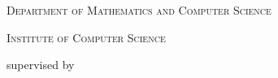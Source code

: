 \begin{titlepage}
	{\scshape\large Department of Mathematics and Computer Science}
    
	\vspace{-0.4cm}
	{\scshape\large Institute of Computer Science}
	\vspace{0.5cm}

    

    \vspace{0.8cm}

	supervised by
    
    \vspace{-0.4cm}
	\mysupervisor
    
    \vspace{-0.4cm}
    \mysecondsupervisor
	\vfill

	{\large \@date}

\hypersetup{pageanchor=true}
\end{titlepage}
